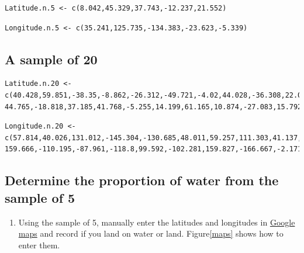 \documentclass[letterpaper,9pt,twoside,printwatermark=false]{pinp}
\providecommand{\tightlist}{%
  \setlength{\itemsep}{0pt}\setlength{\parskip}{0pt}}
\begin{document}
\begin{ShadedResult}
\begin{verbatim}
Latitude.n.5 <- c(8.042,45.329,37.743,-12.237,21.552)
\end{verbatim}
\end{ShadedResult}\begin{ShadedResult}
\begin{verbatim}
Longitude.n.5 <- c(35.241,125.735,-134.383,-23.623,-5.339)
\end{verbatim}
\end{ShadedResult}

\subsection*{A sample of 20}\label{a-sample-of-20}

\begin{ShadedResult}
\begin{verbatim}
Latitude.n.20 <- c(40.428,59.851,-38.35,-8.862,-26.312,-49.721,-4.02,44.028,-36.308,22.071,
44.765,-18.818,37.185,41.768,-5.255,14.199,61.165,10.874,-27.083,15.792)
\end{verbatim}
\end{ShadedResult}\begin{ShadedResult}
\begin{verbatim}
Longitude.n.20 <- c(57.814,40.026,131.012,-145.304,-130.685,48.011,59.257,111.303,41.137,-61.05,
159.666,-110.195,-87.961,-118.8,99.592,-102.281,159.827,-166.667,-2.171,-6.664)
\end{verbatim}
\end{ShadedResult}

\subsection{Determine the proportion of water from the sample of
5}\label{determine-the-proportion-of-water-from-the-sample-of-5}

\begin{enumerate}
\def\labelenumi{\arabic{enumi}.}
\tightlist
\item
  Using the sample of 5, manually enter the latitudes and longitudes in
  \href{https://www.google.com/maps}{Google maps} and record if you land
  on water or land. Figure\ref{maps} shows how to enter them.
\end{enumerate}
\end{document}
